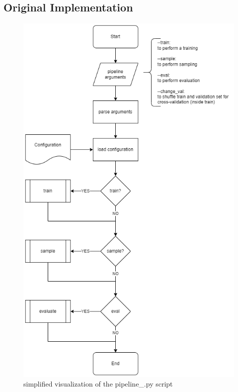 \subsection[]{Original Implementation}
\begin{figure}[!b]
	\centering
	\includegraphics[width=\textwidth, height=0.7\textheight, keepaspectratio]{images/pipeline-ORIGINAL.png}
	\caption[Pipeline Script]{simplified visualization of the pipeline\_\*.py script}
\end{figure}

